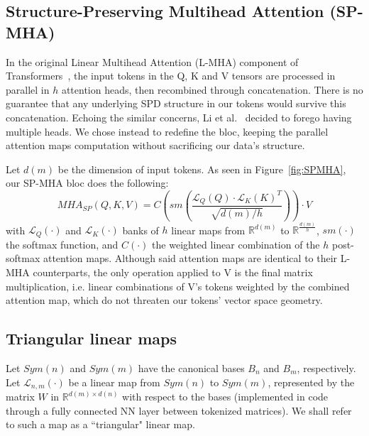\documentclass{article}
\begin{document}
\subsection{Structure-Preserving Multihead Attention (SP-MHA)}
\label{ssec:SPMHA}

In the original Linear Multihead Attention (L-MHA) component of Transformers~\cite{transformers}, the input tokens in the Q, K and V tensors are processed in parallel in $h$ attention heads, then recombined through concatenation.
There is no guarantee that any underlying SPD structure in our tokens would survive this concatenation. Echoing the similar concerns, Li et al.~\cite{li2022geodesic} decided to forego having multiple heads. We chose instead to redefine the bloc, keeping the parallel attention maps computation without sacrificing our data's structure.

Let $d(m)$ be the dimension of input tokens.
As seen in Figure~\ref{fig:SPMHA}, our SP-MHA bloc does the following:
\begin{equation}
\label{eq:SPMHA}
MHA_{SP}(Q, K, V) = C\left(sm\left(\dfrac{\mathcal{L}_Q(Q) \cdot \mathcal{L}_K(K)^T}{\sqrt{d(m)/h}}\right)\right) \cdot V
\end{equation}
with $\mathcal{L}_Q(\cdot)$ and $\mathcal{L}_K(\cdot)$ banks of $h$ linear maps from $\mathbb{R}^{d(m)}$ to $\mathbb{R}^{\frac{d(m)}{h}}$, $sm(\cdot)$ the softmax function, and $C(\cdot)$ the weighted linear combination of the $h$ post-softmax attention maps.
Although said attention maps are identical to their L-MHA counterparts, the only operation applied to V is the final matrix multiplication, i.e. linear combinations of V's tokens weighted by the combined attention map, which do not threaten our tokens' vector space geometry.

\subsection{Triangular linear maps}
\label{ssec:justification}

Let $Sym(n)$ and $Sym(m)$ have the canonical bases $B_{n}$ and $B_{m}$, respectively. Let $\mathcal{L}_{n, m}(\cdot)$ be a linear map from $Sym(n)$ to $Sym(m)$, represented by the matrix $W$ in $\mathbb{R}^{d(m) \times d(n)}$ with respect to the bases (implemented in code through a fully connected NN layer between tokenized matrices). We shall refer to such a map as a ``triangular" linear map.
\end{document}
